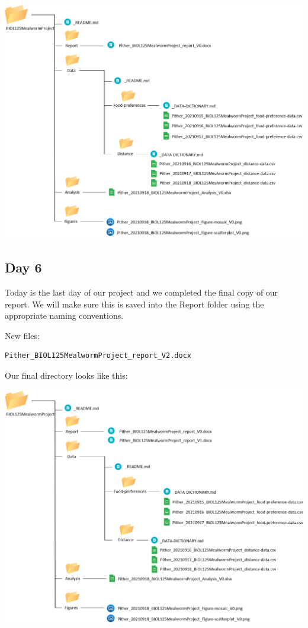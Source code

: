 \documentclass[
]{book}
\begin{document}
\includegraphics{images/DS_directory-example-4.png}

\hypertarget{day-6-1}{%
\subsection*{Day 6}\label{day-6-1}}

Today is the last day of our project and we completed the final copy of our report. We will make sure this is saved into the Report folder using the appropriate naming conventions.

New files:

\begin{verbatim}
Pither_BIOL125MealwormProject_report_V2.docx
\end{verbatim}

Our final directory looks like this:

\includegraphics{images/DS_directory-example-5.png}
\end{document}
